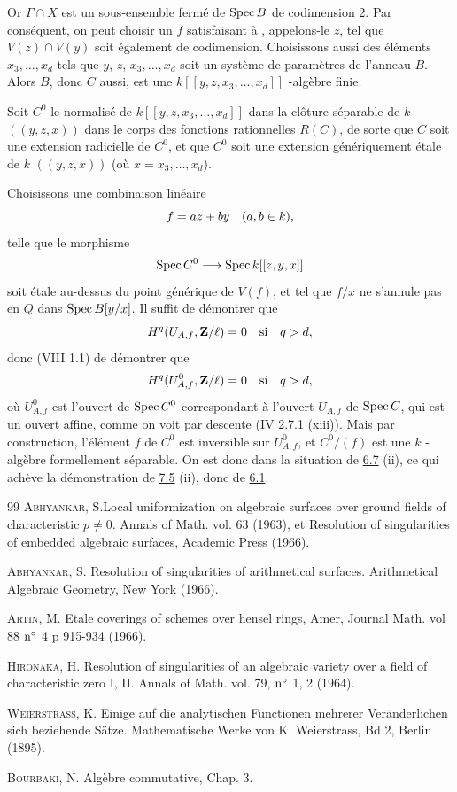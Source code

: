 \documentclass[10pt]{../fichiers-configuration-latex/smfart}
\begin{document}
Or $\Gamma\cap X$ est un sous-ensemble fermé de $\operatorname{Spec} B$ de codimension
2. Par conséquent, on peut choisir un $f$ satisfaisant à ,
appelons-le $z$, tel que $V(z)\cap V(y)$ soit également de
codimension. Choisissons aussi des éléments
$x_{3},\ldots,x_{d}$ tels que $y$, $z$, $x_{3},\ldots,x_{d}$ soit un
système de paramètres de l'anneau $B$. Alors $B$, donc $C$ aussi, est
une $k[[y,z,x_{3},\ldots,x_{d}]]$ -algèbre finie.

Soit $C^{0}$ le normalisé de $k[[y,z,x_{3},\ldots,x_{d}]]$ dans la
clôture séparable de $k$ $((y,z,x))$ dans le corps des fonctions
rationnelles $R(C)$, de sorte que $C$ soit une extension radicielle de
$C^{0}$, et que $C^{0}$ soit une extension génériquement étale de $k$
$((y,z,x))$ (où $x=x_{3},\ldots,x_{d}$).

Choisissons une combinaison linéaire
$$
f=az+by\quad (a,b\in k){},
$$
telle que le morphisme
$$
\operatorname{Spec} C^{0}\longrightarrow \operatorname{Spec} k[[z,y,x]]
$$
soit étale au-dessus du point générique de $V(f)$, et tel que $f/x$ ne
s'annule pas en $Q$ dans $\operatorname{Spec} B[y/x]$. Il suffit de démontrer que
$$
H^{q}(U_{A,f},\mathbf{Z}/\ell)=0\quad\text{\rm si}\quad q>d{},
$$
donc (VIII 1.1) de démontrer que
$$
H^{q}(U^{0}_{A,f},\mathbf{Z}/\ell)=0\quad\text{\rm si}\quad
q>d{},
$$
où $U^{0}_{A,f}$ est l'ouvert de $\operatorname{Spec} C^{0}$ correspondant à
l'ouvert $U_{A,f}$ de $\operatorname{Spec} C$, qui est un ouvert affine, comme on
voit par descente (\EGA IV 2.7.1 (xiii)). Mais par construction,
l'élément $f$ de $C^{0}$ est inversible sur $U^{0}_{A,f}$, et
$C^{0}/(f)$ est une $k$ -algèbre formellement séparable. On est donc
dans la situation de \hyperref[XIX.lem6.7]{6.7} (ii), ce qui achève 
la démonstration de \hyperref[XIX.lem7.5]{7.5} (ii), donc de \hyperref[XIX.thm6.1]{6.1}.

\begin{thebibliography}{99}
 \textsc{Abhyankar}, S.\pageoriginale Local uniformization on
algebraic surfaces over ground fields of characteristic $p\neq
0$. Annals of Math. vol. 63 (1963), et Resolution of singularities of
embedded algebraic surfaces, Academic Press (1966).

 \textsc{Abhyankar}, S. Resolution of singularities of
arithmetical surfaces. Arithmetical Algebraic Geometry, New York
(1966).

 \textsc{Artin}, M. Etale coverings of schemes over hensel
rings, Amer, Journal Math. vol 88 ${\rm n^{\circ}}$ 4 p 915-934
(1966).

 \textsc{Hironaka}, H. Resolution of singularities of an
algebraic variety over a field of characteristic zero I, II. Annals of
Math. vol. 79, ${\rm n^{\circ}}$ 1, 2 (1964).

 \textsc{Weierstrass}, K. Einige auf die analytischen
Functionen mehrerer Veränderlichen sich beziehende
Sätze. Mathematische Werke von K. Weierstrass, Bd 2, Berlin (1895).

 \textsc{Bourbaki}, N. Algèbre commutative, Chap. 3.
\end{thebibliography}



\ifx\danslelivre\undefined
\end{document}

